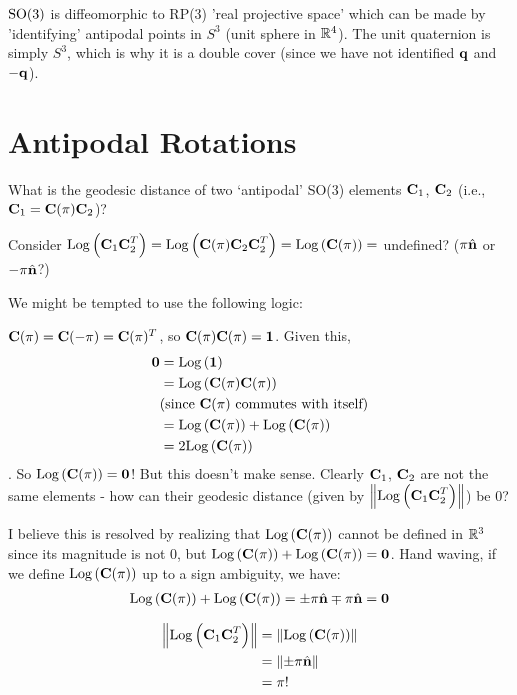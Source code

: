  $\LieGroupSO{3}$ is diffeomorphic to RP(3) 'real projective space' which can be made by 'identifying' antipodal points in $S^3$ (unit sphere in $\RealNumbers^4$). The unit quaternion is simply $S^3$, which is why it is a double cover (since we have not identified $\quat$ and $-\quat$).


\section{Antipodal Rotations}

What is the geodesic distance of two ‘antipodal’ SO(3) elements $\Matrix{C}_1$, $\Matrix{C}_2$ (i.e., $\Matrix{C}_1 = \Matrix{C}(\pi)\Matrix{C}_2$)? 

Consider $\MatLog{\Matrix{C}_1\Matrix{C}_2^T} = \MatLog{\Matrix{C}(\pi)\Matrix{C}_2\Matrix{C}_2^T} = \MatLog{\Matrix{C}(\pi)} =$ undefined? ($\pi \hat{\Vector{n}}$ or $-\pi\hat{\Vector{n}}$?)

We might be tempted to use the following logic:

$\Matrix{C}(\pi) = \Matrix{C}(-\pi) = \Matrix{C}(\pi)^T$, so $\Matrix{C}(\pi)\Matrix{C}(\pi) = \Matrix{1}$. 
Given this, 
\begin{align}
\Vector{0} &= \MatLog{\Matrix{1}} \\
&= \MatLog{\Matrix{C}(\pi)\Matrix{C}(\pi)} \\
&(\text{since}  ~\Matrix{C}(\pi)~ \text{commutes with itself}) \\
&= \MatLog{\Matrix{C}(\pi)} + \MatLog{\Matrix{C}(\pi)} \\  &= 2 \MatLog{\Matrix{C}(\pi)}
\end{align}. 
So $\MatLog{\Matrix{C}(\pi)} = \Vector{0}$! But this doesn't make sense. Clearly $\Matrix{C}_1$, $\Matrix{C}_2$ are not the same elements - how can their geodesic distance (given by $\Norm{\MatLog{\Matrix{C}_1\Matrix{C}_2^T}}$) be 0?

I believe this is resolved by realizing that $\MatLog{\Matrix{C}(\pi)}$ cannot be defined in $\Real^3$ since its magnitude is not 0, but  $\MatLog{\Matrix{C}(\pi)} + \MatLog{\Matrix{C}(\pi)} = \Vector{0}$. Hand waving, if we define $\MatLog{\Matrix{C}(\pi)}$ up to a sign ambiguity, we have:
\begin{align}
\MatLog{\Matrix{C}(\pi)} + \MatLog{\Matrix{C}(\pi)} = \pm \pi \hat{\Vector{n}} \mp \pi\hat{\Vector{n}} = \Vector{0}
\end{align}

\begin{align}
\Norm{\MatLog{\Matrix{C}_1\Matrix{C}_2^T}} &=\Norm{\MatLog{\Matrix{C}(\pi)}} \\
&=\Norm{\pm \pi \hat{\Vector{n}}} \\ 
&= \pi!
\end{align}



